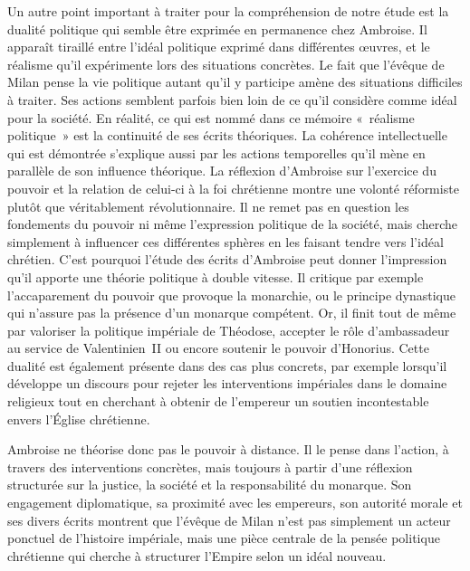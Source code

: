 \bigskip

Un autre point important à traiter pour la compréhension de notre étude est la dualité politique qui semble être exprimée en permanence chez Ambroise. Il apparaît tiraillé entre l'idéal politique exprimé dans différentes œuvres, et le réalisme qu'il expérimente lors des situations concrètes. Le fait que l'évêque de Milan pense la vie politique autant qu'il y participe amène des situations difficiles à traiter. Ses actions semblent parfois bien loin de ce qu'il considère comme idéal pour la société. En réalité, ce qui est nommé dans ce mémoire «~réalisme politique~» est la continuité de ses écrits théoriques. La cohérence intellectuelle qui est démontrée s'explique aussi par les actions temporelles qu'il mène en parallèle de son influence théorique. La réflexion d'Ambroise sur l'exercice du pouvoir et la relation de celui-ci à la foi chrétienne montre une volonté réformiste plutôt que véritablement révolutionnaire. Il ne remet pas en question les fondements du pouvoir ni même l'expression politique de la société, mais cherche simplement à influencer ces différentes sphères en les faisant tendre vers l’idéal chrétien. C'est pourquoi l'étude des écrits d'Ambroise peut donner l'impression qu'il apporte une théorie politique à double vitesse. Il critique par exemple l'accaparement du pouvoir que provoque la monarchie, ou le principe dynastique qui n'assure pas la présence d'un monarque compétent. Or, il finit tout de même par valoriser la politique impériale de Théodose, accepter le rôle d'ambassadeur au service de Valentinien~II ou encore soutenir le pouvoir d'Honorius. Cette dualité est également présente dans des cas plus concrets, par exemple lorsqu'il développe un discours pour rejeter les interventions impériales dans le domaine religieux tout en cherchant à obtenir de l'empereur un soutien incontestable envers l'Église chrétienne.

\bigskip

Ambroise ne théorise donc pas le pouvoir à distance. Il le pense dans l’action, à travers des interventions concrètes, mais toujours à partir d’une réflexion structurée sur la justice, la société et la responsabilité du monarque. Son engagement diplomatique, sa proximité avec les empereurs, son autorité morale et ses divers écrits montrent que l’évêque de Milan n’est pas simplement un acteur ponctuel de l’histoire impériale, mais une pièce centrale de la pensée politique chrétienne qui cherche à structurer l’Empire selon un idéal nouveau.

\bigskip

